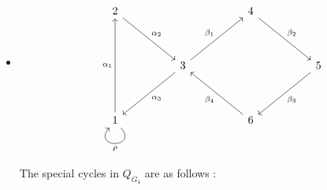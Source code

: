 \documentclass{amsart}
\numberwithin{figure}{section}
\begin{document}
\begin{itemize}
    \item[(4)]
    \leavevmode
    \begin{center}
        \[\begin{tikzcd}[row sep=huge,column sep=huge]
	2 && 4 & \\
	& 3 && 5 \\
	1 && 6
	\arrow["{\alpha_2}", from=1-1, to=2-2]
	\arrow["{\beta_2}", from=1-3, to=2-4]
	\arrow["{\beta_1}", from=2-2, to=1-3]
	\arrow["{\alpha_3}", from=2-2, to=3-1]
	\arrow["{\beta_3}", from=2-4, to=3-3]
	\arrow["{\alpha_1}", from=3-1, to=1-1]
	\arrow["{\beta_4}", from=3-3, to=2-2]
   \arrow["\rho", out=310, in=230, distance=2.5em, from=3-1, to=3-1]
\end{tikzcd}\]
    \end{center}
    The special cycles in $Q_{G_4}$ are as follows : 


\end{itemize}
\end{document}
